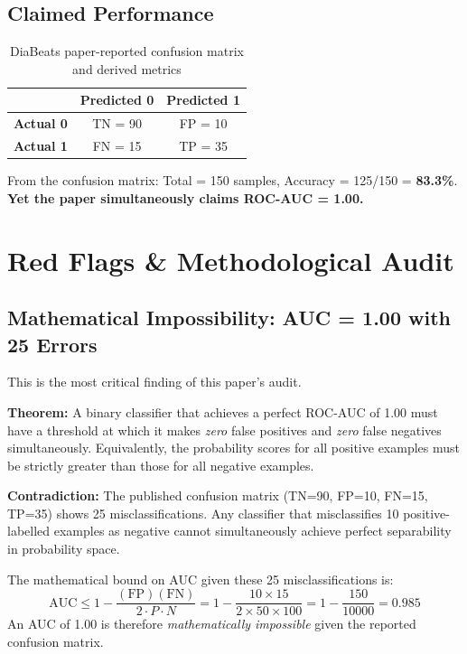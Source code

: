 \documentclass[12pt,a4paper]{article}
\begin{document}
\subsection{Claimed Performance}
\begin{table}[h!]
  \centering
  \caption{DiaBeats paper-reported confusion matrix and derived metrics}
  \begin{tabular}{lcc}
    \toprule
    & \textbf{Predicted 0} & \textbf{Predicted 1}\\
    \midrule
    \textbf{Actual 0} & TN = 90 & FP = 10\\
    \textbf{Actual 1} & FN = 15 & TP = 35\\
    \bottomrule
  \end{tabular}
\end{table}

\noindent From the confusion matrix: Total = 150 samples, Accuracy = 125/150 = \textbf{83.3\%}.\\
\textbf{Yet the paper simultaneously claims ROC-AUC = 1.00.}

\section{Red Flags \& Methodological Audit}
\subsection{Mathematical Impossibility: AUC = 1.00 with 25 Errors}
This is the most critical finding of this paper's audit.

\textbf{Theorem:} A binary classifier that achieves a perfect ROC-AUC of 1.00 must have a threshold at which it makes \emph{zero} false positives and \emph{zero} false negatives simultaneously. Equivalently, the probability scores for all positive examples must be strictly greater than those for all negative examples.

\textbf{Contradiction:} The published confusion matrix (TN=90, FP=10, FN=15, TP=35) shows 25 misclassifications. Any classifier that misclassifies 10 positive-labelled examples as negative cannot simultaneously achieve perfect separability in probability space.

The mathematical bound on AUC given these 25 misclassifications is:
\begin{equation}
  \text{AUC} \leq 1 - \frac{(\text{FP})(\text{FN})}{2 \cdot P \cdot N} = 1 - \frac{10 \times 15}{2 \times 50 \times 100} = 1 - \frac{150}{10000} = 0.985
\end{equation}
An AUC of 1.00 is therefore \emph{mathematically impossible} given the reported confusion matrix.
\end{document}
